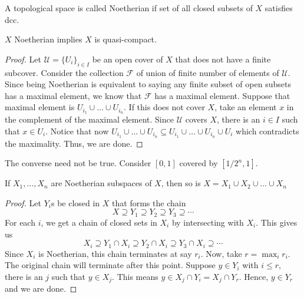 \documentclass[oneside, 12pt]{scrbook}
\theoremstyle{theorem}
\begin{document}
\begin{definition}
A topological space is called Noetherian if set of all closed subsets of $X$ satisfies dcc.
\end{definition}

\begin{lemma}
$X$ Noetherian implies $X$ is quasi-compact.
\end{lemma}

\begin{proof}
Let $\mathcal{U}=\{U_{i}\}_{i \in I}$ be an open cover of $X$ that does not have a finite subcover. Consider the collection $\mathcal{F}$ of union of finite number of elements of $\mathcal{U}$. Since being Noetherian is equivalent to saying any finite subset of open subsets has a maximal element, we know that $\mathcal{F}$ has a maximal element. Suppose that maximal element is $U_{i_{1}} \cup \hdots \cup U_{i_{n}}$. If this does not cover $X$, take an element $x$ in the complement of the maximal element. Since $\mathcal{U}$ covers $X$, there is an $i \in I$ such that $x \in U_{i}$. Notice that now $U_{i_{1}} \cup \hdots \cup U_{i_{n}} \subseteq U_{i_{1}} \cup \hdots \cup U_{i_{n}} \cup U_{i}$ which contradicts the maximality. Thus, we are done.  
\end{proof}

\begin{remark}
The converse need not be true. Consider $[0,1]$ covered by $[1/2^n , 1]$.
\end{remark}

\begin{lemma}
If $X_{1}, \hdots , X_{n}$ are Noetherian subspaces of $X$, then so is $X=X_{1} \cup X_{2} \cup \hdots \cup X_{n}$
\end{lemma}

\begin{proof}
Let $Y_{i}$s be closed in $X$ that forms the chain $$X \supseteq Y_{1} \supseteq Y_{2} \supseteq Y_{3} \supseteq \cdots $$ For each $i$, we get a chain of closed sets in $X_{i}$ by intersecting with $X_{i}$. This gives us $$X_{i} \supseteq Y_{1}\cap X_{i} \supseteq Y_{2}\cap X_{i} \supseteq Y_{3}\cap X_{i} \supseteq \cdots $$ Since $X_{i}$ is Noetherian, this chain terminates at say $r_{i}$. Now, take $r = \max_{i} r_{i}$. The original chain will terminate after this point. Suppose $y \in Y_{i}$ with $i \le r$, there is an $j$ such that $y \in X_{j}$. This means $y \in X_{j} \cap Y_{i} = X_{j} \cap Y_{r}$. Hence, $y \in Y_{r}$ and we are done.
\end{proof}
\end{document}
